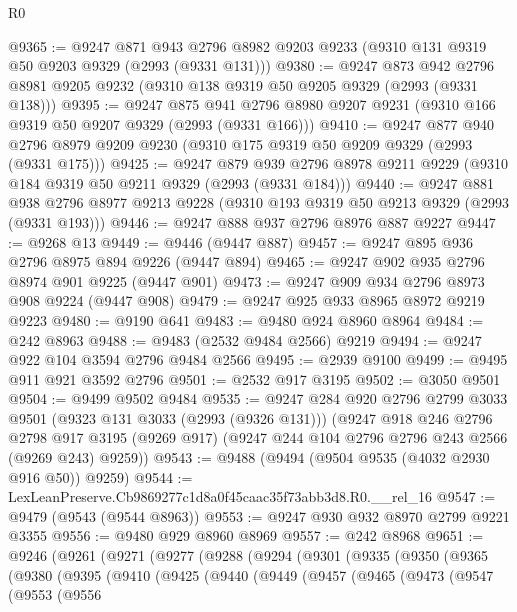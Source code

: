 \begin{lexlean}{R0}
\begin{coremodule}
@9365 := @9247
    @871
    @943
    @2796
    @8982
    @9203
    @9233
    (@9310 @131 @9319 @50 @9203 @9329 (@2993 (@9331 @131)))
@9380 := @9247
    @873
    @942
    @2796
    @8981
    @9205
    @9232
    (@9310 @138 @9319 @50 @9205 @9329 (@2993 (@9331 @138)))
@9395 := @9247
    @875
    @941
    @2796
    @8980
    @9207
    @9231
    (@9310 @166 @9319 @50 @9207 @9329 (@2993 (@9331 @166)))
@9410 := @9247
    @877
    @940
    @2796
    @8979
    @9209
    @9230
    (@9310 @175 @9319 @50 @9209 @9329 (@2993 (@9331 @175)))
@9425 := @9247
    @879
    @939
    @2796
    @8978
    @9211
    @9229
    (@9310 @184 @9319 @50 @9211 @9329 (@2993 (@9331 @184)))
@9440 := @9247
    @881
    @938
    @2796
    @8977
    @9213
    @9228
    (@9310 @193 @9319 @50 @9213 @9329 (@2993 (@9331 @193)))
@9446 := @9247 @888 @937 @2796 @8976 @887 @9227
@9447 := @9268 @13
@9449 := @9446 (@9447 @887)
@9457 := @9247 @895 @936 @2796 @8975 @894 @9226 (@9447 @894)
@9465 := @9247 @902 @935 @2796 @8974 @901 @9225 (@9447 @901)
@9473 := @9247 @909 @934 @2796 @8973 @908 @9224 (@9447 @908)
@9479 := @9247 @925 @933 @8965 @8972 @9219 @9223
@9480 := @9190 @641
@9483 := @9480 @924 @8960 @8964
@9484 := @242 @8963
@9488 := @9483 (@2532 @9484 @2566) @9219
@9494 := @9247 @922 @104 @3594 @2796 @9484 @2566
@9495 := @2939 @9100
@9499 := @9495 @911 @921 @3592 @2796
@9501 := @2532 @917 @3195
@9502 := @3050 @9501
@9504 := @9499 @9502 @9484
@9535 := @9247
    @284
    @920
    @2796
    @2799
    @3033
    @9501
    (@9323 @131 @3033 (@2993 (@9326 @131)))
    (@9247
      @918
      @246
      @2796
      @2798
      @917
      @3195
      (@9269 @917)
      (@9247 @244 @104 @2796 @2796 @243 @2566 (@9269 @243) @9259))
@9543 := @9488 (@9494 (@9504 @9535 (@4032 @2930 @916 @50)) @9259)
@9544 := LexLeanPreserve.Cb9869277c1d8a0f45caac35f73abb3d8.R0.__rel_16
@9547 := @9479 (@9543 (@9544 @8963))
@9553 := @9247 @930 @932 @8970 @2799 @9221 @3355
@9556 := @9480 @929 @8960 @8969
@9557 := @242 @8968
@9651 := @9246
    (@9261
      (@9271
        (@9277
          (@9288
            (@9294
              (@9301
                (@9335
                  (@9350
                    (@9365
                      (@9380
                        (@9395
                          (@9410
                            (@9425
                              (@9440
                                (@9449
                                  (@9457
                                    (@9465
                                      (@9473
                                        (@9547
                                          (@9553
                                            (@9556

\end{coremodule}
\end{lexlean}

